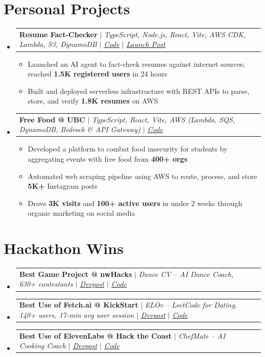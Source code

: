 \documentclass[letterpaper,11pt]{article}
\makeatletter
\newcommand{\resumeItem}[1]{
  \item\small{
    \setlength{\baselineskip}{0.0pt}
    {#1\par\vspace{0.5pt}}
  }
}
\newcommand{\resumeProjectHeading}[2]{
    \item
    \begin{tabular*}{0.97\textwidth}{l@{\extracolsep{\fill}}r}
      \small#1 & #2 \\
    \end{tabular*}\vspace{-7pt}
}
\newcommand{\resumeSubHeadingListStart}{\begin{itemize}[leftmargin=0.15in, label={}]}
\newcommand{\resumeSubHeadingListEnd}{\end{itemize}}
\newcommand{\resumeItemListStart}{\begin{itemize}}
\newcommand{\resumeItemListEnd}{\end{itemize}\vspace{-7pt}}
\makeatother
\begin{document}
\section{Personal Projects}
  \resumeSubHeadingListStart
        \resumeProjectHeading
          {\textbf{Resume Fact-Checker} $|$ \emph{TypeScript, Node.js, React, Vite, AWS CDK, Lambda, S3, DynamoDB $|$ \href{https://github.com/douglasichen/resume-bs-detector}{{\underline{Code}}} $|$ \href{https://www.linkedin.com/feed/update/urn:li:activity:7424145830577729536/}{{\underline{Launch Post}}}}}{}
      \resumeItemListStart
        \resumeItem{Launched an AI agent to fact-check resumes against internet sources; reached \textbf{1.5K registered users} in 24 hours}
        \resumeItem{Built and deployed serverless infrastructure with REST APIs to parse, store, and verify \textbf{1.8K resumes} on AWS}
      \resumeItemListEnd
        \resumeProjectHeading
          {\textbf{Free Food @ UBC} $|$ \emph{TypeScript, React, Vite, AWS (Lambda, SQS, DynamoDB, Bedrock \& API Gateway) $|$ \href{https://github.com/douglasichen/ubceventscdk}{{\underline{Code}}}}}{}
      \resumeItemListStart
        \resumeItem{Developed a platform to combat food insecurity for students by aggregating events with free food from \textbf{400+ orgs}}
        \resumeItem{Automated web scraping pipeline using AWS to route, process, and store \textbf{5K+} Instagram posts}
        \resumeItem{Drove \textbf{3K visits} and \textbf{100+ active users} in under 2 weeks through organic marketing on social media}
      \resumeItemListEnd
  \resumeSubHeadingListEnd

\section{Hackathon Wins}
  \resumeSubHeadingListStart
        \resumeProjectHeading
          {\textbf{Best Game Project @ nwHacks} $|$ \emph{Dance CV -- AI Dance Coach, 630+ contestants $|$ \href{https://devpost.com/software/dance-cv}{{\underline{Devpost}}} $|$ \href{https://github.com/douglasichen/DanceCV}{{\underline{Code}}}}}{}
        \resumeProjectHeading
          {\textbf{Best Use of Fetch.ai @ KickStart} $|$ \emph{ELOv -- LeetCode for Dating, 140+ users, 17-min avg user session $|$ \href{https://devpost.com/software/elov}{{\underline{Devpost}}} $|$ \href{https://github.com/douglasichen/ELOv}{{\underline{Code}}}}}{}
        \resumeProjectHeading
          {\textbf{Best Use of ElevenLabs @ Hack the Coast} $|$ \emph{ChefMate -- AI Cooking Coach $|$ \href{https://devpost.com/software/chefmate-j0mh5d}{{\underline{Devpost}}} $|$ \href{https://github.com/douglasichen/HTC2026}{{\underline{Code}}}}}{}
      \vspace{-8pt}
  \resumeSubHeadingListEnd
\end{document}
